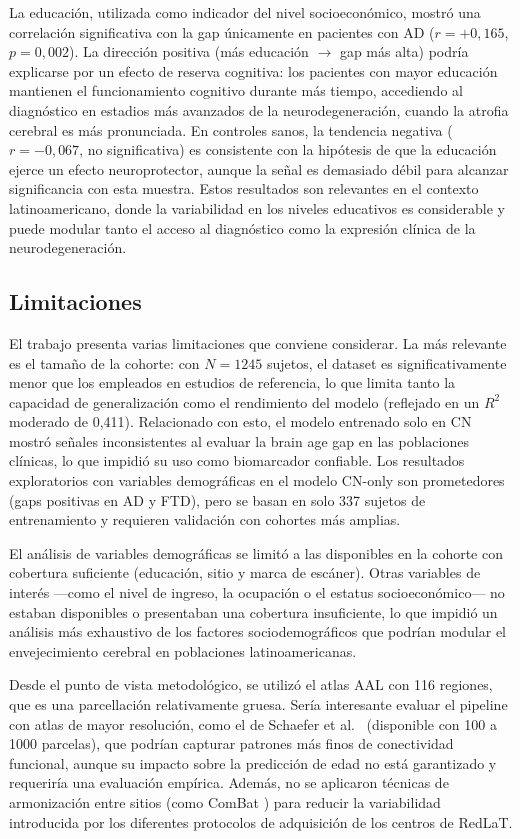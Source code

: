 La educación, utilizada como indicador del nivel socioeconómico, mostró una correlación significativa con la gap únicamente en pacientes con AD ($r = +0{,}165$, $p = 0{,}002$). La dirección positiva (más educación $\rightarrow$ gap más alta) podría explicarse por un efecto de reserva cognitiva: los pacientes con mayor educación mantienen el funcionamiento cognitivo durante más tiempo, accediendo al diagnóstico en estadios más avanzados de la neurodegeneración, cuando la atrofia cerebral es más pronunciada. En controles sanos, la tendencia negativa ($r = -0{,}067$, no significativa) es consistente con la hipótesis de que la educación ejerce un efecto neuroprotector, aunque la señal es demasiado débil para alcanzar significancia con esta muestra. Estos resultados son relevantes en el contexto latinoamericano, donde la variabilidad en los niveles educativos es considerable y puede modular tanto el acceso al diagnóstico como la expresión clínica de la neurodegeneración.

\subsection{Limitaciones}
\label{sec:limitaciones}

El trabajo presenta varias limitaciones que conviene considerar. La más relevante es el tamaño de la cohorte: con $N = 1245$ sujetos, el dataset es significativamente menor que los empleados en estudios de referencia, lo que limita tanto la capacidad de generalización como el rendimiento del modelo (reflejado en un $R^2$ moderado de 0,411). Relacionado con esto, el modelo entrenado solo en CN mostró señales inconsistentes al evaluar la brain age gap en las poblaciones clínicas, lo que impidió su uso como biomarcador confiable. Los resultados exploratorios con variables demográficas en el modelo CN-only son prometedores (gaps positivas en AD y FTD), pero se basan en solo 337 sujetos de entrenamiento y requieren validación con cohortes más amplias.

El análisis de variables demográficas se limitó a las disponibles en la cohorte con cobertura suficiente (educación, sitio y marca de escáner). Otras variables de interés ---como el nivel de ingreso, la ocupación o el estatus socioeconómico--- no estaban disponibles o presentaban una cobertura insuficiente, lo que impidió un análisis más exhaustivo de los factores sociodemográficos que podrían modular el envejecimiento cerebral en poblaciones latinoamericanas.

Desde el punto de vista metodológico, se utilizó el atlas AAL con 116 regiones, que es una parcellación relativamente gruesa. Sería interesante evaluar el pipeline con atlas de mayor resolución, como el de Schaefer et al.\ \cite{schaefer2018local} (disponible con 100 a 1000 parcelas), que podrían capturar patrones más finos de conectividad funcional, aunque su impacto sobre la predicción de edad no está garantizado y requeriría una evaluación empírica. Además, no se aplicaron técnicas de armonización entre sitios (como ComBat \cite{fortin2017harmonization}) para reducir la variabilidad introducida por los diferentes protocolos de adquisición de los centros de RedLaT.

